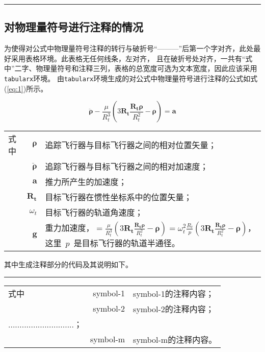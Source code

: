 \noindent\hrule
\subsection{对物理量符号进行注释的情况}
为使得对公式中物理量符号注释的转行与破折号“———”后第一个字对齐，此处最好采用表格环境。此表格无任何线条，左对齐，
且在破折号处对齐，一共有“式中”二字、物理量符号和注释三列，表格的总宽度可选为文本宽度，因此应该采用\verb|tabularx|环境。
由\verb|tabularx|环境生成的对公式中物理量符号进行注释的公式如式(\ref{eq:1})所示。

\begin{equation}\label{eq:1}
\ddot{\boldsymbol{\rho}}-\frac{\mu}{R_{t}^{3}}\left(3\mathbf{R_{t}}\frac{\mathbf{R_{t}\rho}}{R_{t}^{2}}-\boldsymbol{\rho}\right)=\mathbf{a}
\end{equation}

\begin{tabularx}{\textwidth}{@{}l@{\quad}r@{———}X@{}}
式中& $\bm{\rho}$ &追踪飞行器与目标飞行器之间的相对位置矢量；\\
&  $\bm{\ddot{\rho}}$&追踪飞行器与目标飞行器之间的相对加速度；\\
&  $\mathbf{a}$   &推力所产生的加速度；\\
&  $\mathbf{R_t}$ & 目标飞行器在惯性坐标系中的位置矢量；\\
&  $\omega_{t}$ & 目标飞行器的轨道角速度；\\
&  $\mathbf{g}$ & 重力加速度，$=\frac{\mu}{R_{t}^{3}}\left(
3\mathbf{R_{t}}\frac{\mathbf{R_{t}\rho}}{R_{t}^{2}}-\bm{\rho}\right)=\omega_{t}^{2}\frac{R_{t}}{p}\left(
3\mathbf{R_{t}}\frac{\mathbf{R_{t}\rho}}{R_{t}^{2}}-\bm{\rho}\right)$，这里~$p$~是目标飞行器的轨道半通径。
\end{tabularx}
\vspace{\wordsep}

其中生成注释部分的代码及其说明如下。

\vspace{1em}\noindent\hrule

\begin{VerbWithBreak}
\begin{tabularx}{\textwidth}{@{}l@{\quad}r@{— — —}X@{}}
式中 & symbol-1 & symbol-1的注释内容；\\
     & symbol-2 & symbol-2的注释内容；\\
     .............................；\\
     & symbol-m & symbol-m的注释内容。
\end{tabularx}\vspace{\wordsep}
\end{VerbWithBreak}

